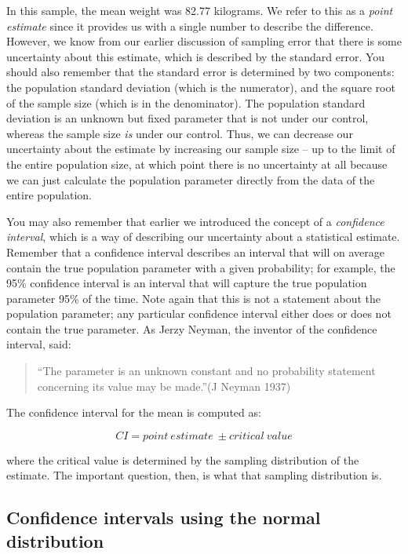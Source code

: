 \documentclass[]{book}
\theoremstyle{definition}
\theoremstyle{definition}
\theoremstyle{definition}
\theoremstyle{remark}
\begin{document}
In this sample, the mean weight was 82.77 kilograms. We refer to this as
a \emph{point estimate} since it provides us with a single number to
describe the difference. However, we know from our earlier discussion of
sampling error that there is some uncertainty about this estimate, which
is described by the standard error. You should also remember that the
standard error is determined by two components: the population standard
deviation (which is the numerator), and the square root of the sample
size (which is in the denominator). The population standard deviation is
an unknown but fixed parameter that is not under our control, whereas
the sample size \emph{is} under our control. Thus, we can decrease our
uncertainty about the estimate by increasing our sample size -- up to
the limit of the entire population size, at which point there is no
uncertainty at all because we can just calculate the population
parameter directly from the data of the entire population.

You may also remember that earlier we introduced the concept of a
\emph{confidence interval}, which is a way of describing our uncertainty
about a statistical estimate. Remember that a confidence interval
describes an interval that will on average contain the true population
parameter with a given probability; for example, the 95\% confidence
interval is an interval that will capture the true population parameter
95\% of the time. Note again that this is not a statement about the
population parameter; any particular confidence interval either does or
does not contain the true parameter. As Jerzy Neyman, the inventor of
the confidence interval, said:

\begin{quote}
``The parameter is an unknown constant and no probability statement
concerning its value may be made.''(J Neyman 1937)
\end{quote}

The confidence interval for the mean is computed as:

\[
CI = point\ estimate\ \pm critical\ value
\]

where the critical value is determined by the sampling distribution of
the estimate. The important question, then, is what that sampling
distribution is.

\subsection{Confidence intervals using the normal
distribution}\label{confidence-intervals-using-the-normal-distribution}
\end{document}
